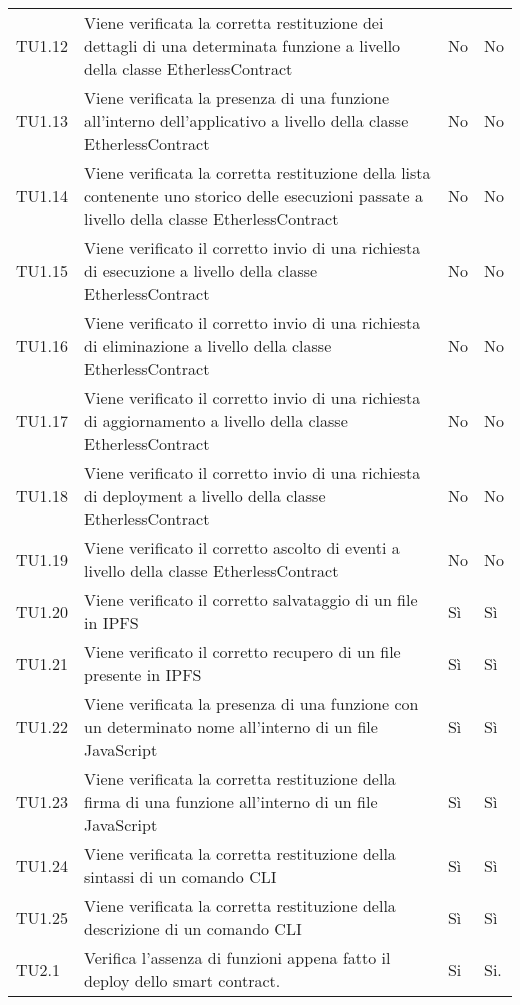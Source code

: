 \begin{longtable}{
		>{\centering}p{}
		>{}p{}
		>{\centering}p{}
		>{\centering}p{} }
		TU1.12 &
		Viene verificata la corretta restituzione dei dettagli di una determinata funzione a livello della classe EtherlessContract &
		No &
		No \tabularnewline

		TU1.13 &
		Viene verificata la presenza di una funzione all’interno dell’applicativo a livello della classe EtherlessContract &
		No &
		No \tabularnewline

		TU1.14 &
		Viene verificata la corretta restituzione della lista contenente uno storico delle esecuzioni passate a livello della classe EtherlessContract &
		No &
		No \tabularnewline

		TU1.15 &
		Viene verificato il corretto invio di una richiesta di esecuzione a livello della classe EtherlessContract &
		No &
		No \tabularnewline

		TU1.16 &
		Viene verificato il corretto invio di una richiesta di eliminazione a livello della classe EtherlessContract &
		No &
		No \tabularnewline

		TU1.17 &
		Viene verificato il corretto invio di una richiesta di aggiornamento a livello della classe EtherlessContract &
		No &
		No \tabularnewline

		TU1.18 &
		Viene verificato il corretto invio di una richiesta di deployment a livello della classe EtherlessContract &
		No &
		No \tabularnewline

		TU1.19 &
		Viene verificato il corretto ascolto di eventi a livello della classe EtherlessContract &
		No &
		No \tabularnewline

		TU1.20 &
		Viene verificato il corretto salvataggio di un file in IPFS &
		Sì &
		Sì \tabularnewline

		TU1.21 &
		Viene verificato il corretto recupero di un file presente in IPFS &
		Sì &
		Sì \tabularnewline

		TU1.22 &
		Viene verificata la presenza di una funzione con un determinato nome all’interno di un file JavaScript &
		Sì &
		Sì \tabularnewline

		TU1.23 &
		Viene verificata la corretta restituzione della firma di una funzione all’interno di un file JavaScript &
		Sì &
		Sì \tabularnewline

		TU1.24 &
		Viene verificata la corretta restituzione della sintassi di un comando CLI &
		Sì &
		Sì \tabularnewline

		TU1.25 &
		Viene verificata la corretta restituzione della descrizione di un comando CLI &
		Sì &
		Sì \tabularnewline

		TU2.1   &  Verifica l'assenza di funzioni appena fatto il deploy dello smart contract. &
		Si & Si. \tabularnewline


\end{longtable}

